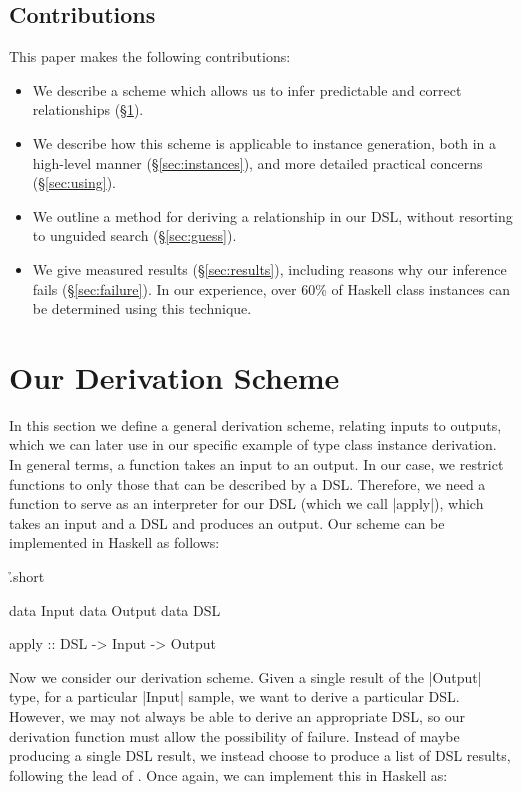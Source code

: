\documentclass[preprint,draft]{sigplanconf}
\begin{document}
\subsection{Contributions}

This paper makes the following contributions:

\begin{itemize}
\item We describe a scheme which allows us to infer predictable and correct relationships (\S\ref{sec:scheme}).
\item We describe how this scheme is applicable to instance generation, both in a high-level manner (\S\ref{sec:instances}), and more detailed practical concerns (\S\ref{sec:using}).
\item We outline a method for deriving a relationship in our DSL, without resorting to unguided search (\S\ref{sec:guess}).
\item We give measured results (\S\ref{sec:results}), including reasons why our inference fails (\S\ref{sec:failure}). In our experience, over 60\% of Haskell class instances can be determined using this technique.
\end{itemize}

\section{Our Derivation Scheme}
\label{sec:scheme}

In this section we define a general derivation scheme, relating inputs to outputs, which we can later use in our specific example of type class instance derivation. In general terms, a function takes an input to an output. In our case, we restrict functions to only those that can be described by a DSL. Therefore, we need a function to serve as an interpreter for our DSL (which we call |apply|), which takes an input and a DSL and produces an output. Our scheme can be implemented in Haskell as follows:

\h{.short}\begin{code}
data Input
data Output
data DSL

apply :: DSL -> Input -> Output
\end{code}

Now we consider our derivation scheme. Given a single result of the |Output| type, for a particular |Input| sample, we want to derive a particular DSL. However, we may not always be able to derive an appropriate DSL, so our derivation function must allow the possibility of failure. Instead of maybe producing a single DSL result, we instead choose to produce a list of DSL results, following the lead of \citet{wadler:list_of_successes}. Once again, we can implement this in Haskell as:
\end{document}
